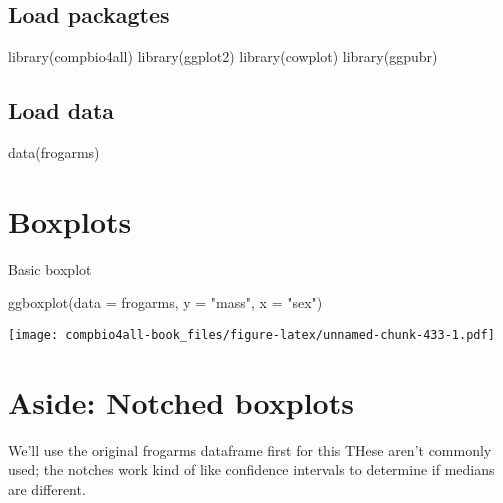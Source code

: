 \documentclass[
]{book}
\newenvironment{Shaded}{\begin{snugshade}}{\end{snugshade}}
\newcommand{\AttributeTok}[1]{\textcolor[rgb]{0.77,0.63,0.00}{#1}}
\newcommand{\FunctionTok}[1]{\textcolor[rgb]{0.00,0.00,0.00}{#1}}
\newcommand{\NormalTok}[1]{#1}
\newcommand{\StringTok}[1]{\textcolor[rgb]{0.31,0.60,0.02}{#1}}
\begin{document}
\hypertarget{load-packagtes}{%
\subsection{Load packagtes}\label{load-packagtes}}

\begin{Shaded}
\begin{Highlighting}[]
\FunctionTok{library}\NormalTok{(compbio4all)}
\FunctionTok{library}\NormalTok{(ggplot2)}
\FunctionTok{library}\NormalTok{(cowplot)}
\FunctionTok{library}\NormalTok{(ggpubr)}
\end{Highlighting}
\end{Shaded}

\hypertarget{load-data-1}{%
\subsection{Load data}\label{load-data-1}}

\begin{Shaded}
\begin{Highlighting}[]
\FunctionTok{data}\NormalTok{(frogarms)}
\end{Highlighting}
\end{Shaded}

\hypertarget{boxplots-2}{%
\section{Boxplots}\label{boxplots-2}}

Basic boxplot

\begin{Shaded}
\begin{Highlighting}[]
\FunctionTok{ggboxplot}\NormalTok{(}\AttributeTok{data =}\NormalTok{ frogarms,}
          \AttributeTok{y =} \StringTok{"mass"}\NormalTok{,}
          \AttributeTok{x =} \StringTok{"sex"}\NormalTok{)}
\end{Highlighting}
\end{Shaded}

\texttt{[image: compbio4all-book\_files/figure-latex/unnamed-chunk-433-1.pdf]}

\hypertarget{aside-notched-boxplots}{%
\section{Aside: Notched boxplots}\label{aside-notched-boxplots}}

We'll use the original frogarms dataframe first for this
THese aren't commonly used; the notches work kind of like confidence intervals to determine if medians are different.
\end{document}
